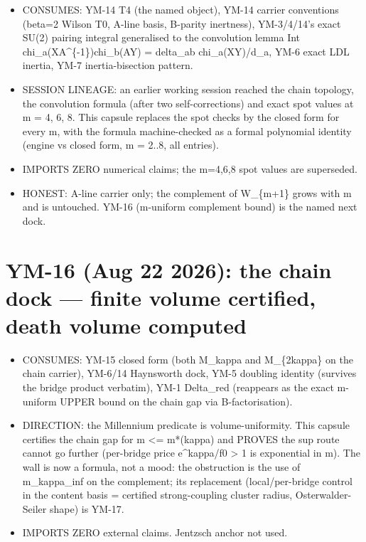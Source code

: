 \begin{itemize}
\tightlist
\item
  CONSUMES: YM-14 T4 (the named object), YM-14 carrier conventions
  (beta=2 Wilson T0, A-line basis, B-parity inertness), YM-3/4/14's exact
  SU(2) pairing integral generalised to the convolution lemma
  Int chi\_a(XA\^{}\{-1\})chi\_b(AY) = delta\_ab chi\_a(XY)/d\_a, YM-6 exact LDL
  inertia, YM-7 inertia-bisection pattern.
\item
  SESSION LINEAGE: an earlier working session reached the chain topology,
  the convolution formula (after two self-corrections) and exact spot
  values at m = 4, 6, 8. This capsule replaces the spot checks by the
  closed form for every m, with the formula machine-checked as a formal
  polynomial identity (engine vs closed form, m = 2..8, all entries).
\item
  IMPORTS ZERO numerical claims; the m=4,6,8 spot values are superseded.
\item
  HONEST: A-line carrier only; the complement of W\_\{m+1\} grows with m and
  is untouched. YM-16 (m-uniform complement bound) is the named next dock.
\end{itemize}

\hypertarget{ym-16-aug-22-2026-the-chain-dock-finite-volume-certified-death-volume-computed}{%
\section{YM-16 (Aug 22 2026): the chain dock --- finite volume certified, death volume computed}\label{ym-16-aug-22-2026-the-chain-dock-finite-volume-certified-death-volume-computed}}

\begin{itemize}
\tightlist
\item
  CONSUMES: YM-15 closed form (both M\_kappa and M\_\{2kappa\} on the chain
  carrier), YM-6/14 Haynsworth dock, YM-5 doubling identity (survives the
  bridge product verbatim), YM-1 Delta\_red (reappears as the exact
  m-uniform UPPER bound on the chain gap via B-factorisation).
\item
  DIRECTION: the Millennium predicate is volume-uniformity. This capsule
  certifies the chain gap for m \textless= m*(kappa) and PROVES the sup route
  cannot go further (per-bridge price e\^{}kappa/f0 \textgreater{} 1 is exponential in m).
  The wall is now a formula, not a mood: the obstruction is the use of
  \textbar m\_kappa\textbar\_inf on the complement; its replacement (local/per-bridge
  control in the content basis = certified strong-coupling cluster
  radius, Osterwalder-Seiler shape) is YM-17.
\item
  IMPORTS ZERO external claims. Jentzsch anchor not used.
\end{itemize}

